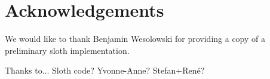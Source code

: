\section{Acknowledgements}
We would like to thank Benjamin Wesolowski for providing a copy of a preliminary sloth implementation.

Thanks to...
Sloth code?
Yvonne-Anne?
Stefan+René?
